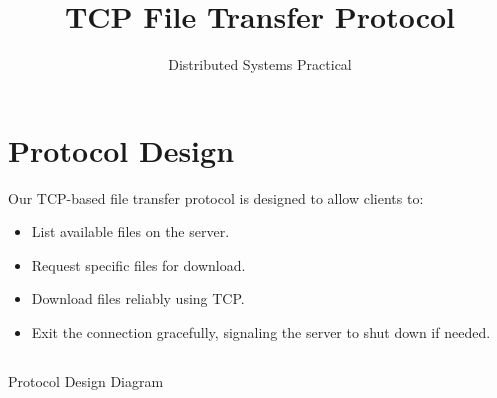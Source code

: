 \documentclass{article}
\title{TCP File Transfer Protocol}
\author{Distributed Systems Practical}
\date{}
\begin{document}
\maketitle

\section{Protocol Design}
Our TCP-based file transfer protocol is designed to allow clients to:
\begin{itemize}
    \item List available files on the server.
    \item Request specific files for download.
    \item Download files reliably using TCP.
    \item Exit the connection gracefully, signaling the server to shut down if needed.
\end{itemize}

\clearpage
\subsection{}{Protocol Design Diagram}
\end{document}
